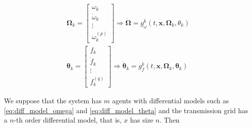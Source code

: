 \begin{gather}
	\boldsymbol{\Omega}_k = \left[\begin{array}{c} \omega_k \\[3mm] \dot{\omega}_k\\[3mm] \vdots \\[3mm] \omega_k^{(p)} \end{array}\right] \Rightarrow \dot{\boldsymbol{\Omega}} = g_\omega^k \left(t,\mathbf{x},\boldsymbol{\Omega}_k,\theta_k\right) \label{eq:diff_model_omega}\\
	\boldsymbol{\theta}_k = \left[\begin{array}{c} f_k \\[3mm] \dot{f}_k \\[3mm] \vdots \\[3mm] f^{(q)}_k \end{array}\right] \Rightarrow \dot{\boldsymbol{\theta}}_k = g_f^k\left(t,\mathbf{x},\boldsymbol{\Omega}_k,\boldsymbol{\theta}_k\right) \label{eq:diff_model_theta}
\end{gather}

	We suppose that the system has $m$ agents with differential models such as \eqref{eq:diff_model_omega} and \eqref{eq:diff_model_theta} and the transmission grid has a $n$-th order differential model, that is, $x$ has size $n$. Then


